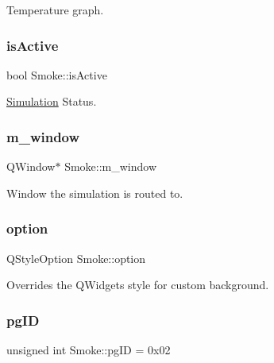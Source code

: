 Temperature graph. 

\mbox{\label{classSmoke_a83c338b4ec7a3d71443e8f1fd9d7a1b5}} 
\subsubsection{\texorpdfstring{isActive}{isActive}}
{\footnotesize\ttfamily bool Smoke\+::is\+Active\hspace{0.3cm}{\ttfamily [private]}}



\mbox{\hyperlink{classSimulation}{Simulation}} Status. 

\mbox{\label{classSmoke_a75cc318af83d2cf39a6609b8becafe38}} 
\subsubsection{\texorpdfstring{m\_window}{m\_window}}
{\footnotesize\ttfamily Q\+Window$\ast$ Smoke\+::m\+\_\+window\hspace{0.3cm}{\ttfamily [private]}}



Window the simulation is routed to. 

\mbox{\label{classSmoke_adaf76ba29af2bc7105de57280a7e0993}} 
\subsubsection{\texorpdfstring{option}{option}}
{\footnotesize\ttfamily Q\+Style\+Option Smoke\+::option\hspace{0.3cm}{\ttfamily [private]}}



Overrides the Q\+Widget\textquotesingle{}s style for custom background. 

\mbox{\label{classSmoke_a85ac4d6389daf0b33572436f18141397}} 
\subsubsection{\texorpdfstring{pgID}{pgID}}
{\footnotesize\ttfamily unsigned int Smoke\+::pg\+ID = 0x02}



